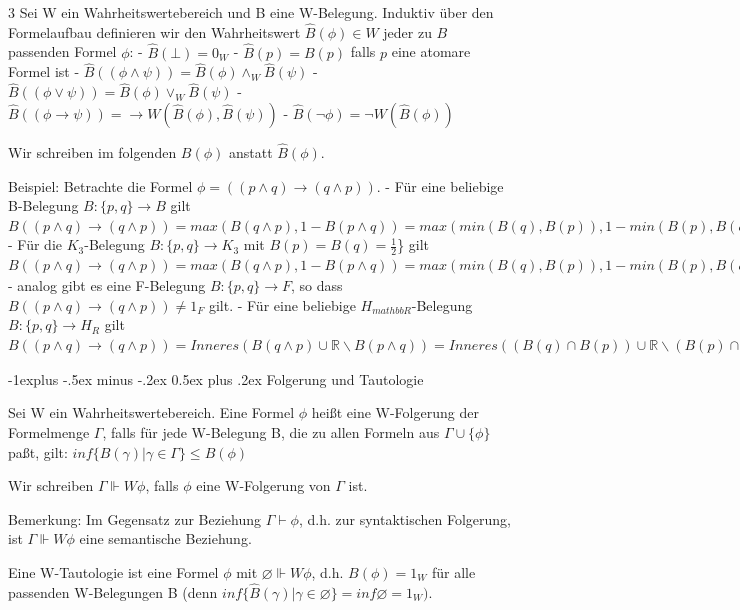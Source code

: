 \documentclass[a4paper]{article}
\makeatletter
\renewcommand{\subsection}{\@startsection{subsection}{2}{0mm}%
                {-1explus -.5ex minus -.2ex}%
                {0.5ex plus .2ex}%
                {\normalfont\normalsize\bfseries}}
\makeatother
\begin{document}
\begin{multicols}{3}
  Sei W ein Wahrheitswertebereich und B eine W-Belegung. Induktiv über den
  Formelaufbau definieren wir den Wahrheitswert $\hat{B}(\phi)\in W$ jeder
  zu $B$ passenden Formel $\phi$: - $\hat{B}(\bot) = 0_W$ -
  $\hat{B}(p) = B(p)$ falls $p$ eine atomare Formel ist -
  $\hat{B}((\phi\wedge \psi )) = \hat{B}(\phi)\wedge_W \hat{B}(\psi )$ -
  $\hat{B}((\phi\vee \psi )) = \hat{B}(\phi)\vee_W \hat{B}(\psi )$ -
  $\hat{B}((\phi\rightarrow \psi )) = \rightarrow W(\hat{B}(\phi),\hat{B}(\psi ))$
  - $\hat{B}(\lnot\phi) = \lnot W(\hat{B}(\phi))$

  Wir schreiben im folgenden $B(\phi)$ anstatt $\hat{B}(\phi)$.

  Beispiel: Betrachte die Formel
  $\phi= ((p\wedge q)\rightarrow (q\wedge p))$. - Für eine beliebige
  B-Belegung $B:\{p,q\}\rightarrow B$ gilt
  $B((p\wedge q)\rightarrow (q\wedge p)) = max(B(q\wedge p), 1 -B(p\wedge q)) = max(min(B(q),B(p)), 1 -min(B(p),B(q))) = 1 = 1_B$
  - Für die $K_3$-Belegung $B:\{p,q\}\rightarrow K_3$ mit
  $B(p) =B(q) = \frac{1}{2}$\} gilt
  $B((p\wedge q)\rightarrow (q\wedge p)) = max(B(q\wedge p), 1 -B(p\wedge q))= max(min(B(q),B(p)), 1 -min(B(p),B(q))) = \frac{1}{2} \not= 1_{K_3}$
  - analog gibt es eine F-Belegung $B:\{p,q\}\rightarrow F$, so dass
  $B((p\wedge q)\rightarrow (q\wedge p)) \not = 1_F$ gilt. - Für eine
  beliebige $H_{mathbb{R}}$-Belegung $B:\{p,q\}\rightarrow H_R$ gilt
  $B((p\wedge q)\rightarrow (q\wedge p)) = Inneres(B(q\wedge p)\cup \mathbb{R}\backslash B(p\wedge q)) = Inneres((B(q)\cap B(p))\cup \mathbb{R}\backslash (B(p)\cap B(q))) = Inneres(\mathbb{R}) = \mathbb{R} = 1_{H_R}$

  \subsection{Folgerung und Tautologie}\label{folgerung-und-tautologie}

  Sei W ein Wahrheitswertebereich. Eine Formel $\phi$ heißt eine
  W-Folgerung der Formelmenge $\Gamma$, falls für jede W-Belegung B, die
  zu allen Formeln aus $\Gamma \cup\{\phi\}$ paßt, gilt:
  $inf\{B(\gamma )|\gamma \in \Gamma \}\leq B(\phi)$

  Wir schreiben $\Gamma \Vdash W\phi$, falls $\phi$ eine W-Folgerung von
  $\Gamma$ ist.

  Bemerkung: Im Gegensatz zur Beziehung $\Gamma \vdash \phi$, d.h. zur
  syntaktischen Folgerung, ist $\Gamma \Vdash W \phi$ eine semantische
  Beziehung.

  Eine W-Tautologie ist eine Formel $\phi$ mit $\varnothing \Vdash W\phi$,
  d.h. $B(\phi) = 1_W$ für alle passenden W-Belegungen B (denn
  $inf\{\hat{B}(\gamma )|\gamma \in \varnothing \}= inf \varnothing = 1_W)$.


\end{multicols}
\end{document}

